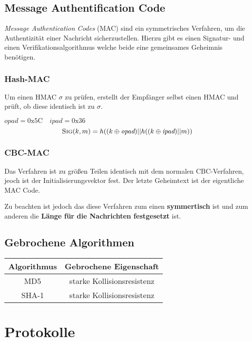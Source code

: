 \documentclass[a4paper,landscape]{article}
\newcommand{\plaint}{\ensuremath{m}}
\newcommand{\sig}{\textsc{Sig}}
\begin{document}
\begin{multicols*}{4}
	\subsection{Message Authentification Code}
	\emph{Message Authentication Codes} (MAC) sind ein symmetrisches Verfahren,
	um die Authentizität einer Nachricht sicherzustellen. Hierzu gibt es einen
	Signatur- und einen Verifikationsalgorithmus welche beide eine gemeinsames
	Geheimnis benötigen.
	\subsubsection{Hash-MAC}
	Um einen HMAC \(\sigma\) zu prüfen, erstellt der Empfänger selbst einen HMAC
	und prüft, ob diese identisch ist zu \(\sigma\). \par
	\(\textit{opad} = \text{0x5C} \quad \textit{ipad} = \text{0x36}\)
	\[\sig(k,\plaint) = h((k \oplus \textit{opad})|| h((k \oplus\textit{ipad})|| m))\]
	\subsubsection{CBC-MAC}
	Das Verfahren ist zu größen Teilen identisch mit dem normalen CBC-Verfahren,
	jeoch ist der Initialisierungsvektor fest. Der letzte Geheimtext ist der
	eigentliche MAC Code. \par
	Zu beachten ist jedoch das diese Verfahren zum einen \textbf{symmertisch}
	ist und zum anderen die \textbf{Länge für die Nachrichten festgesetzt} ist.

	\subsection{Gebrochene Algorithmen}
	\begin{center}
		\begin{tabular}{c| c }
			Algorithmus & Gebrochene Eigenschaft     \\ \hline
			MD5         & starke Kollisionsresistenz \\
			SHA-1       & starke Kollisionsresistenz
		\end{tabular}
	\end{center}

	\section{Protokolle}

\end{multicols*}
\end{document}
